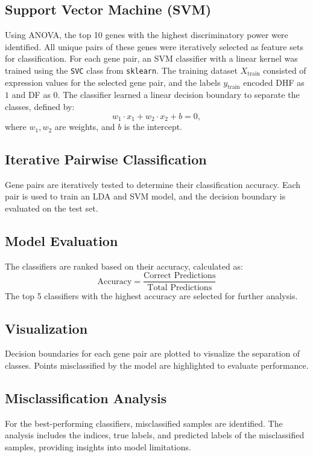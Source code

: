 \documentclass[final]{article}
\begin{document}
\subsection*{Support Vector Machine (SVM)}
Using ANOVA, the top 10 genes with the highest discriminatory power were identified. All unique pairs of these genes were iteratively selected as feature sets for classification. For each gene pair, an SVM classifier with a linear kernel was trained using the \texttt{SVC} class from \texttt{sklearn}. The training dataset \( X_{\text{train}} \) consisted of expression values for the selected gene pair, and the labels \( y_{\text{train}} \) encoded DHF as \(1\) and DF as \(0\). The classifier learned a linear decision boundary to separate the classes, defined by:
\[
w_1 \cdot x_1 + w_2 \cdot x_2 + b = 0,
\]
where \( w_1, w_2 \) are weights, and \( b \) is the intercept.

\subsection*{Iterative Pairwise Classification}
Gene pairs are iteratively tested to determine their classification accuracy. Each pair is used to train an LDA and SVM model, and the decision boundary is evaluated on the test set.

\subsection*{Model Evaluation}
The classifiers are ranked based on their accuracy, calculated as:
\begin{equation}
    \text{Accuracy} = \frac{\text{Correct Predictions}}{\text{Total Predictions}}
\end{equation}
The top 5 classifiers with the highest accuracy are selected for further analysis.

\subsection*{Visualization}
Decision boundaries for each gene pair are plotted to visualize the separation of classes. Points misclassified by the model are highlighted to evaluate performance.

\subsection*{Misclassification Analysis}
For the best-performing classifiers, misclassified samples are identified. The analysis includes the indices, true labels, and predicted labels of the misclassified samples, providing insights into model limitations.
\end{document}
